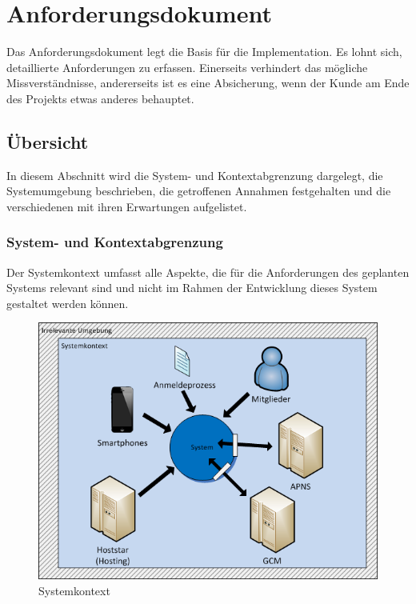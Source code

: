 %
%

\chapter{Anforderungsdokument}\label{chap.anforderungsdokument}

Das Anforderungsdokument legt die Basis für die Implementation. Es lohnt sich, detaillierte Anforderungen zu erfassen. Einerseits verhindert das mögliche Missverständnisse, andererseits ist es eine Absicherung, wenn der Kunde am Ende des Projekts etwas anderes behauptet.

\section{Übersicht}\label{anf_uebersicht}

In diesem Abschnitt  wird die System- und Kontextabgrenzung dargelegt, die Systemumgebung beschrieben, die getroffenen Annahmen festgehalten und die verschiedenen  mit ihren Erwartungen aufgelistet.

\subsection{System- und Kontextabgrenzung}\label{systemabgrenzung}
Der Systemkontext umfasst alle Aspekte, die für die Anforderungen des geplanten Systems relevant sind und nicht im Rahmen der Entwicklung dieses System gestaltet werden können.\cite{req_eng_book} 
\begin{figure}[h]
\includegraphics{images/visio/systemkontext.png}
\caption{Systemkontext}
\label{fig:systemkontext}
\end{figure}

